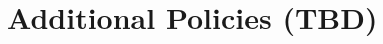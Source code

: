 \chapter{Additional Policies (TBD)}

\pagestyle{fancy}

\fancyhf{}

\fancyfoot[C]{\thepage}

\renewcommand{\headrulewidth}{0pt}
\renewcommand{\footrulewidth}{0pt}
\lipsum[19]
